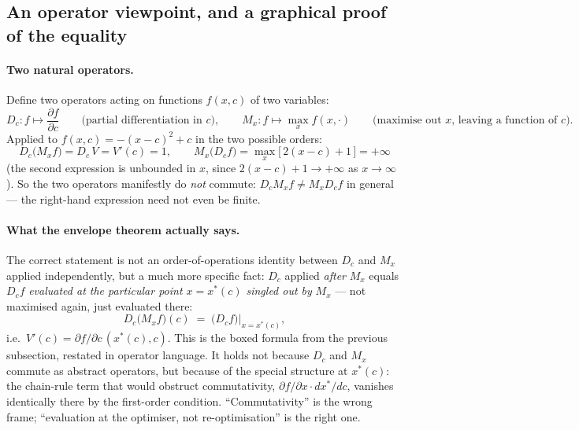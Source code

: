 \documentclass[a4paper,oneside,12pt]{extarticle}
\theoremstyle{plain}
\theoremstyle{definition}
\theoremstyle{remark}
\begin{document}
\subsection{An operator viewpoint, and a graphical proof of the equality}
\label{subsec:envelope_operator}

\paragraph{Two natural operators.}
Define two operators acting on functions $f(x,c)$ of two variables:
\[
  D_c : f \mapsto \frac{\partial f}{\partial c}
  \qquad\text{(partial differentiation in $c$)},
  \qquad
  M_x : f \mapsto \max_x f(x,\cdot)
  \qquad\text{(maximise out $x$, leaving a function of $c$)}.
\]
Applied to $f(x,c)=-(x-c)^2+c$ in the two possible orders:
\[
  D_c\big(M_x f\big) = D_c\, V = V'(c) = 1,
  \qquad
  M_x\big(D_c f\big) = \max_x\big[\,2(x-c)+1\,\big] = +\infty
\]
(the second expression is unbounded in $x$, since $2(x-c)+1\to+\infty$
as $x\to\infty$).  So the two operators manifestly do \emph{not}
commute: $D_cM_x f\ne M_xD_c f$ in general --- the right-hand
expression need not even be finite.

\paragraph{What the envelope theorem actually says.}
The correct statement is not an order-of-operations identity
between $D_c$ and $M_x$ applied independently, but a much more
specific fact: $D_c$ applied \emph{after} $M_x$ equals $D_c f$
\emph{evaluated at the particular point $x=x^*(c)$ singled out by}
$M_x$ --- not maximised again, just evaluated there:
\[
  D_c\big(M_x f\big)(c)
  \;=\;
  \big(D_c f\big)\Big|_{x = x^*(c)},
\]
i.e.\ $V'(c) = \partial f/\partial c\,(x^*(c), c)$.  This is the
boxed formula from the previous subsection, restated in operator
language.  It holds not because $D_c$ and $M_x$ commute as abstract
operators, but because of the special structure at $x^*(c)$: the
chain-rule term that would obstruct commutativity,
$\partial f/\partial x \cdot dx^*/dc$, vanishes identically there
by the first-order condition.  ``Commutativity'' is the wrong frame;
``evaluation at the optimiser, not re-optimisation'' is the right
one.
\end{document}
